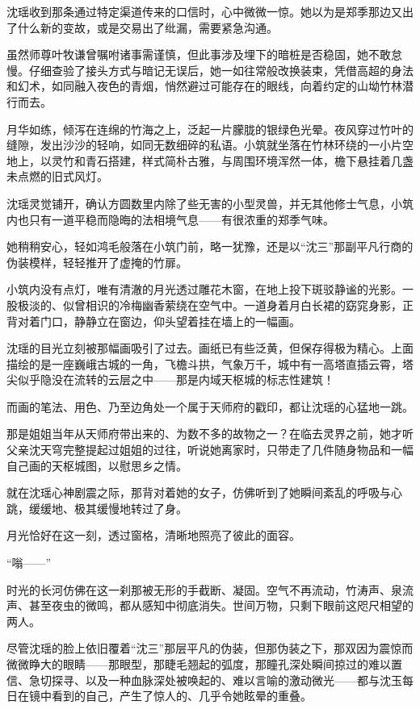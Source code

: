 沈瑶收到那条通过特定渠道传来的口信时，心中微微一惊。她以为是郑季那边又出了什么新的变故，或是交易出了纰漏，需要紧急沟通。

虽然师尊叶牧谦曾嘱咐诸事需谨慎，但此事涉及埋下的暗桩是否稳固，她不敢怠慢。仔细查验了接头方式与暗记无误后，她一如往常般改换装束，凭借高超的身法和幻术，如同融入夜色的青烟，悄然避过可能存在的眼线，向着约定的山坳竹林潜行而去。

月华如练，倾泻在连绵的竹海之上，泛起一片朦胧的银绿色光晕。夜风穿过竹叶的缝隙，发出沙沙的轻响，如同无数细碎的私语。小筑就坐落在竹林环绕的一小片空地上，以灵竹和青石搭建，样式简朴古雅，与周围环境浑然一体，檐下悬挂着几盏未点燃的旧式风灯。

沈瑶灵觉铺开，确认方圆数里内除了些无害的小型灵兽，并无其他修士气息，小筑内也只有一道平稳而隐晦的法相境气息——有很浓重的郑季气味。

她稍稍安心，轻如鸿毛般落在小筑门前，略一犹豫，还是以“沈三”那副平凡行商的伪装模样，轻轻推开了虚掩的竹扉。

小筑内没有点灯，唯有清澈的月光透过雕花木窗，在地上投下斑驳静谧的光影。一股极淡的、似曾相识的冷梅幽香萦绕在空气中。一道身着月白长裙的窈窕身影，正背对着门口，静静立在窗边，仰头望着挂在墙上的一幅画。

沈瑶的目光立刻被那幅画吸引了过去。画纸已有些泛黄，但保存得极为精心。上面描绘的是一座巍峨古城的一角，飞檐斗拱，气象万千，城中有一高塔直插云霄，塔尖似乎隐没在流转的云层之中——那是内域天枢城的标志性建筑！

而画的笔法、用色、乃至边角处一个属于天师府的戳印，都让沈瑶的心猛地一跳。

那是姐姐当年从天师府带出来的、为数不多的故物之一？在临去灵界之前，她才听父亲沈天穹完整提起过姐姐的过往，听说她离家时，只带走了几件随身物品和一幅自己画的天枢城图，以慰思乡之情。

就在沈瑶心神剧震之际，那背对着她的女子，仿佛听到了她瞬间紊乱的呼吸与心跳，缓缓地、极其缓慢地转过了身。

月光恰好在这一刻，透过窗格，清晰地照亮了彼此的面容。

“嗡——”

时光的长河仿佛在这一刹那被无形的手截断、凝固。空气不再流动，竹涛声、泉流声、甚至夜虫的微鸣，都从感知中彻底消失。世间万物，只剩下眼前这咫尺相望的两人。

尽管沈瑶的脸上依旧覆着“沈三”那层平凡的伪装，但那伪装之下，那双因为震惊而微微睁大的眼睛——那眼型，那睫毛翘起的弧度，那瞳孔深处瞬间掠过的难以置信、急切探寻、以及一种血脉深处被唤起的、难以言喻的激动微光——都与沈玉每日在镜中看到的自己，产生了惊人的、几乎令她眩晕的重叠。

